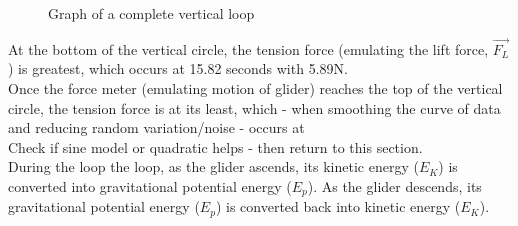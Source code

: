 \documentclass[11pt, a4paper]{article}
\begin{document}
	\begin{figure}[H]
		\centering
		\caption{Graph of a complete vertical loop}
	\end{figure}
	At the bottom of the vertical circle, the tension force (emulating the lift force, $\vec{F_L}$) is greatest, which occurs at 15.82 seconds with 5.89N.\\
	Once the force meter (emulating motion of glider) reaches the top of the vertical circle, the tension force is at its least, which - when smoothing the curve of data and reducing random variation/noise - occurs at\\
	Check if sine model or quadratic helps - then return to this section.\\
	During the loop the loop, as the glider ascends, its kinetic energy ($E_K$) is converted into gravitational potential energy ($E_p$). As the glider descends, its gravitational potential energy ($E_p$) is converted back into kinetic energy ($E_K$).\\
	
\end{document}
